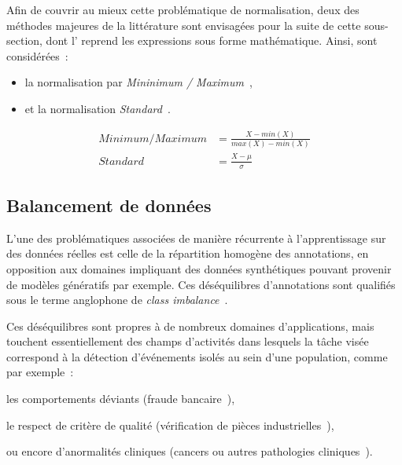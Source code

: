 Afin de couvrir au mieux cette problématique de normalisation, deux des méthodes majeures de la littérature sont envisagées pour la suite de cette sous-section, dont l' reprend les expressions sous forme mathématique. Ainsi, sont considérées~:
\begin{itemize}
    \item la normalisation par \textit{Mininimum / Maximum}~\cite{Juszczak2002},
    \item et la normalisation \textit{Standard}~\cite{Celebi2007}.
\end{itemize}\par

\begin{equation} 
    \label{eq:scaling_methods}
    \begin{split}
    Minimum/Maximum&=\frac{X-min(X)}{max(X)-min(X)}  \\
    Standard&=\frac{X-\mu{}}{\sigma}	    
    \end{split}
\end{equation}

\subsection{Balancement de données}
\label{subsec:balancement}
L'une des problématiques associées de manière récurrente à l'apprentissage sur des données réelles est celle de la répartition homogène des annotations, en opposition aux domaines impliquant des données synthétiques pouvant provenir de modèles génératifs par exemple. Ces déséquilibres d'annotations sont qualifiés sous le terme anglophone de \textit{class imbalance}~\cite{Prati2009, He2009}.\par

Ces déséquilibres sont propres à de nombreux domaines d'applications, mais touchent essentiellement des champs d'activités dans lesquels la tâche visée correspond à la détection d'événements isolés au sein d'une population, comme par exemple~: 
\begin{inlinerate}
    \item les comportements déviants (fraude bancaire~\cite{Phua2004}),
    \item le respect de critère de qualité (vérification de pièces industrielles~\cite{Wu2018}),
    \item ou encore d'anormalités cliniques (cancers ou autres pathologies cliniques~\cite{Celebi2007}).
\end{inlinerate}\par

